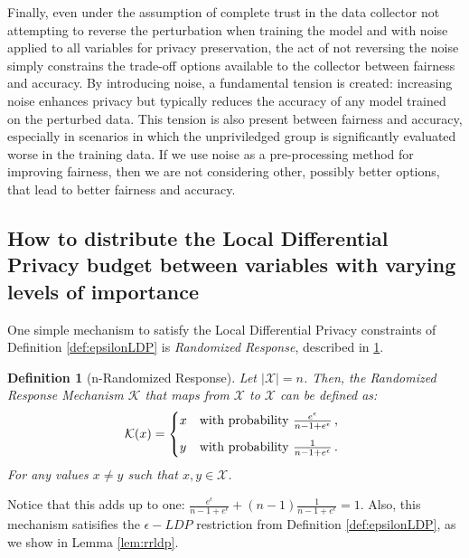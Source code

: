 \documentclass[conference]{IEEEtran}
\newtheorem{definition}{Definition}
\begin{document}
Finally, even under the assumption of complete trust in the data collector not attempting to reverse the perturbation when training the model and with noise applied to all variables for privacy preservation, the act of not reversing the noise simply constrains the trade-off options available to the collector between fairness and accuracy. By introducing noise, a fundamental tension is created: increasing noise enhances privacy but typically reduces the accuracy of any model trained on the perturbed data\cite{ren2018textsf}. This tension is also present between fairness and accuracy, especially in scenarios in which the unpriviledged group is significantly evaluated worse in the training data\cite{Carlos}. If we use noise as a pre-processing method for improving fairness, then we are not considering other, possibly better options, that lead to better fairness and accuracy\cite{Reductions}\cite{konstantinov2022impossibility}.

\subsection{How to distribute the Local Differential Privacy budget between variables with varying levels of importance}\label{subsec:ldpbudget}

One simple mechanism to satisfy the Local Differential Privacy constraints of Definition \ref{def:epsilonLDP} is \emph{Randomized Response}, described in \ref{def:nrr}.

\begin{definition}[n-Randomized Response]\label{def:nrr} Let $|\mathcal{X}| = n$. Then, the Randomized Response Mechanism $\mathcal{K}$ that maps from $\mathcal{X}$ to $\mathcal{X}$ can be defined as:
	\[
	\mathcal{K}(x) = 
	\begin{dcases*}
		x
		& with probability $\frac{e^\epsilon}{n-1+e^\epsilon}$\,, \\[1ex]
		y 
	   	& with probability $\frac{1}{n-1+e^\epsilon}$\,.
	\end{dcases*}
	\]
For any values $x\neq y$ such that $x,y\in\mathcal{X}$.
\end{definition}

Notice that this adds up to one: $\frac{e^\epsilon}{n-1+e^\epsilon}+(n-1)\frac{1}{n-1+e^\epsilon}=1$. Also, this mechanism satisifies the $\epsilon-LDP$ restriction from Definition \ref{def:epsilonLDP}, as we show in Lemma \ref{lem:rrldp}.
\end{document}
